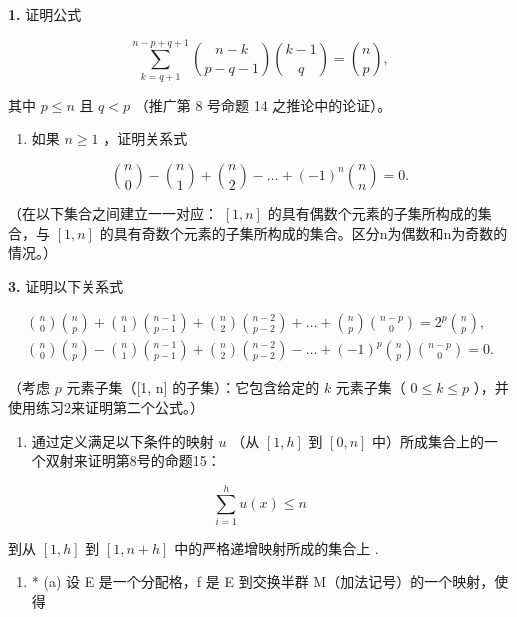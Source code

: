 \exercisegroup

\textbf{1.} 证明公式

\[
\sum_ {k = q + 1} ^ {n - p + q + 1} \binom {n - k} {p - q - 1} \binom {k - 1} {q} = \binom {n} {p},
\]

其中 \(p \leqslant n\) 且 \(q < p\) （推广第 8 号命题 14 之推论中的论证）。

\begin{enumerate}
\def\labelenumi{\arabic{enumi}.}
\setcounter{enumi}{1}
\tightlist
\item
  如果 \(n \geqslant 1\) ，证明关系式
\end{enumerate}

\[
\binom {n} {0} - \binom {n} {1} + \binom {n} {2} - \dots + (- 1) ^ {n} \binom {n} {n} = 0.
\]

（在以下集合之间建立一一对应： \([1, n]\) 的具有偶数个元素的子集所构成的集合，与 \([1, n]\) 的具有奇数个元素的子集所构成的集合。区分n为偶数和n为奇数的情况。）

\textbf{3.} 证明以下关系式

\[
\begin{array}{l} \binom {n} {0} \binom {n} {p} + \binom {n} {1} \binom {n - 1} {p - 1} + \binom {n} {2} \binom {n - 2} {p - 2} + \dots + \binom {n} {p} \binom {n - p} {0} = 2 ^ {p} \binom {n} {p}, \\ \binom {n} {0} \binom {n} {p} - \binom {n} {1} \binom {n - 1} {p - 1} + \binom {n} {2} \binom {n - 2} {p - 2} - \dots + (- 1) ^ {p} \binom {n} {p} \binom {n - p} {0} = 0. \end{array}
\]

（考虑 \(p\) 元素子集（{[}1, n{]} 的子集）：它包含给定的 \(k\) 元素子集（ \(0 \leqslant k \leqslant p\) ），并使用练习2来证明第二个公式。）

\begin{enumerate}
\def\labelenumi{\arabic{enumi}.}
\setcounter{enumi}{3}
\tightlist
\item
  通过定义满足以下条件的映射 \(u\) （从 \([1, h]\) 到 \([0, n]\) 中）所成集合上的一个双射来证明第8号的命题15：
\end{enumerate}

\[
\sum_ {i = 1} ^ {h} u (x) \leqslant n
\]

到从 \([1, h]\) 到 \([1, n + h]\) 中的严格递增映射所成的集合上 .

\begin{enumerate}
\def\labelenumi{\arabic{enumi}.}
\setcounter{enumi}{4}
\tightlist
\item
  * (a) 设 E 是一个分配格，f 是 E 到交换半群 M（加法记号）的一个映射，使得
\end{enumerate}

